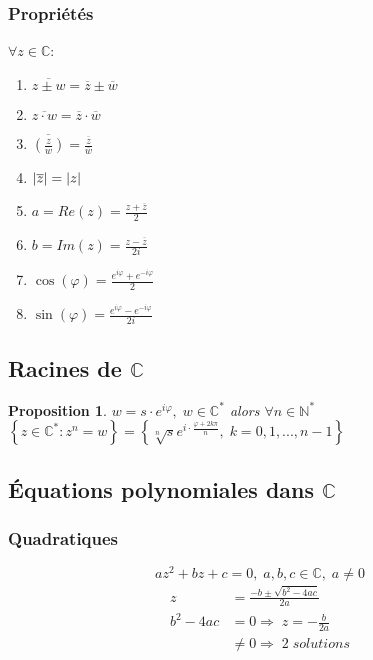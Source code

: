 \documentclass[10pt,a4paper]{book}
\newcommand{\N}{\mathbb{N}}
\newcommand{\C}{\mathbb{C}}
\DeclarePairedDelimiter\abs{\lvert}{\rvert}
\newtheorem{proposition}{Proposition}[section]
\begin{document}
\subsubsection{Propriétés}
$\forall z\in \C$:
\begin{enumerate}
\item $\overline{z \pm w} = \overline{z} \pm \overline{w}$
\item $\overline{z \cdot w} = \overline{z} \cdot \overline{w}$
\item $\overline{\left(\frac{z}{w}\right)} = \frac{\overline{z}}{\overline{w}}$
\item $\abs{\overline{z}} = \abs{z}$
\item $a = Re(z) = \frac{z + \overline{z}}{2}$
\item $b = Im(z) = \frac{z - \overline{z}}{2i}$
\item $\cos(\varphi) = \frac{e^{i\varphi} + e^{-i\varphi}}{2}$
\item $\sin(\varphi) = \frac{e^{i\varphi} - e^{-i\varphi}}{2i}$
\end{enumerate}

\subsection{Racines de \texorpdfstring{$\C$}{complexes}}

\begin{proposition}
$w = s\cdot e^{i\varphi},\; w\in \C^*$ alors $\forall n\in \N^*$ \\
$\left\lbrace z\in \C^*: z^n = w \right\rbrace = \left\lbrace \sqrt[n]{s} e^{i\cdot \frac{\varphi+2k\pi}{n}},\; k=0,1,...,n-1\right\rbrace$
\end{proposition}

\subsection{Équations polynomiales dans \texorpdfstring{$\C$}{C}}

\subsubsection{Quadratiques}

\begin{equation*}
az^2 + bz + c = 0,\; a,b,c\in \C,\; a\neq 0
\end{equation*}
\begin{equation*}
\begin{split}
z &= \frac{-b \pm \sqrt{b^2-4ac}}{2a} \\
b^2-4ac &= 0 \Rightarrow \; z = -\frac{b}{2a} \\
&\neq 0 \Rightarrow \; 2\; solutions 
\end{split}
\end{equation*}
\end{document}
